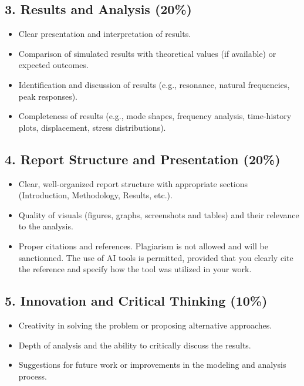 \documentclass[a4paper,12pt]{article}
\begin{document}
\subsection*{3. Results and Analysis (20\%)}
\begin{itemize}
    \item Clear presentation and interpretation of results.
    \item Comparison of simulated results with theoretical values (if available) or expected outcomes.
    \item Identification and discussion of results (e.g., resonance, natural frequencies, peak responses).
    \item {\color{blue} Completeness of results (e.g., mode shapes, frequency analysis, time-history plots, displacement, stress distributions).}
\end{itemize}


\subsection*{4. Report Structure and Presentation (20\%)}
\begin{itemize}
    \item Clear, well-organized report structure with appropriate sections (Introduction, Methodology, Results, etc.).
    \item Quality of visuals (figures, graphs, screenshots and tables) and their relevance to the analysis.
    \item Proper citations and references. Plagiarism is not allowed and will be sanctionned. The use of AI tools is permitted, provided that you clearly cite the reference and specify how the tool was utilized in your work.
\end{itemize}

\subsection*{5. Innovation and Critical Thinking (10\%)}
\begin{itemize}
    \item Creativity in solving the problem or proposing alternative approaches.
    \item Depth of analysis and the ability to critically discuss the results.
    \item Suggestions for future work or improvements in the modeling and analysis process.
\end{itemize}
\end{document}
